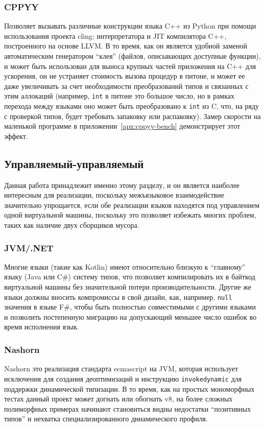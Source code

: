 \documentclass[times,specification,annotation]{itmo-student-thesis}
\begin{document}
\subsubsection{CPPYY}
Позволяет вызывать различные конструкции языка C++ из Python при помощи использования проекта cling: интерпретатора и JIT компилятора C++, построенного на основе LLVM. В то время, как он является удобной заменой автоматическим генератором ``клея'' (файлов, описывающих доступные функции), и может быть использован для выноса крупных частей приложения на C++ для ускорения, он не устраняет стоимость вызова процедур в питоне, и может ее даже увеличивать за счет необходимости преобразований типов и связанных с этим аллокаций (например, \texttt{int} в питоне это большое число, но в рамках перехода между языками оно может быть преобразовано к \texttt{int} из C, что, на ряду с проверкой типов, будет требовать запаковку или распаковку). Замер скорости на маленькой программе в приложении~\ref{apx:cppyy-bench} демонстрирует этот эффект.

\subsection{Управляемый-управляемый}
Данная работа принадлежит именно этому разделу, и он является наиболее интересным для реализации, поскольку межъязыковое взаимодействие значительно упрощается, если обе реализации языков находятся под управлением одной виртуальной машины, поскольку это позволяет избежать многих проблем, таких как наличие двух сборщиков мусора.
\subsubsection{JVM/.NET}
Многие языки (такие как Kotlin) имеют относительно близкую к ``главному'' языку (Java или C\#) систему типов, что позволяет компилировать их в байткод виртуальной машины без значительной потери производительности. Другие же языки должны вносить компромиссы в свой дизайн, как, например, \texttt{null} значения в языке F\#, чтобы быть полностью совместимыми с другими языками и позволить постепенную миграцию на допускающий меньшее число ошибок во время исполнения язык.
\subsubsection{Nashorn}
Nashorn это реализация стандарта ecmascript на JVM, которая использует исключения для создания деоптимизаций и инструкцию \texttt{invokedynamic} для поддержки динамической типизации. В то время, как на простых мономорфных тестах данный проект может догнать или обогнать v8, на более сложных полиморфных примерах начинают становиться видны недостатки ``позитивных типов'' и нехватка специализированного динамического профиля.
\end{document}
